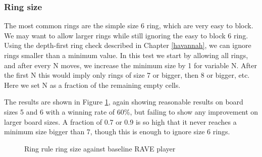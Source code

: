 \subsubsection{Ring size}

The most common rings are the simple size 6 ring, which are very easy to block. We may want to allow larger rings while still ignoring the easy to block 6 ring. Using the depth-first ring check described in Chapter \ref{havannah}, we can ignore rings smaller than a minimum value. In this test we start by allowing all rings, and after every N moves, we increase the minimum size by 1 for variable N. After the first N this would imply only rings of size 7 or bigger, then 8 or bigger, etc. Here we set N as a fraction of the remaining empty cells.

The results are shown in Figure \ref{fig:ringsize}, again showing reasonable results on board sizes 5 and 6 with a winning rate of 60\%, but failing to show any improvement on larger board sizes. A fraction of 0.7 or 0.9 is so high that it never reaches a minimum size bigger than 7, though this is enough to ignore size 6 rings.


\begin{figure}
	\centering
{}
	\caption{Ring rule ring size against baseline RAVE player}
	\label{fig:ringsize}
\end{figure}




